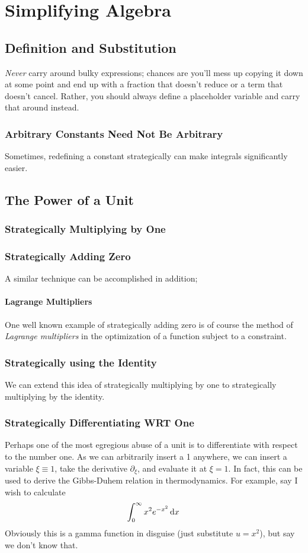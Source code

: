 \chapter{Simplifying Algebra}\label{ch:simp}
\section{Definition and Substitution}
\emph{Never} carry around bulky expressions; chances are you'll mess up copying it down at some point and end up with a fraction that doesn't reduce or a term that doesn't cancel. Rather, you should always define a placeholder variable and carry that around instead.
\subsection{Arbitrary Constants Need Not Be Arbitrary}
Sometimes, redefining a constant strategically can make integrals significantly easier.


\section{The Power of a Unit}
\subsection{Strategically Multiplying by One}\label{sec:smbo}
\subsection{Strategically Adding Zero}
A similar technique can be accomplished in addition;

\subsubsection{Lagrange Multipliers}
One well known example of strategically adding zero is of course the method of \emph{Lagrange multipliers} in the optimization  of a function subject to a constraint.

\subsection{Strategically using the Identity}
We can extend this idea of strategically multiplying by one to strategically multiplying by the identity.

\subsection{Strategically Differentiating WRT One}
Perhaps one of the most egregious abuse of a unit is to differentiate with respect to the number one. As we can arbitrarily insert a 1 anywhere, we can insert a variable \(\xi \equiv 1\), take the derivative \(\partial_\xi\), and evaluate it at \(\xi = 1\). In fact, this can be used to derive the Gibbs-Duhem relation in thermodynamics. For example, say I wish to calculate
\[\int_0^\infty x^2e^{-x^2}\d{x}\]
Obviously this is a gamma function in disguise (just substitute \(u=x^2\)), but say we don't know that.

